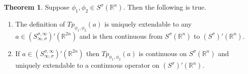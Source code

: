 \documentclass[11pt,a4paper,reqno]{amsart}
\numberwithin{equation}{section}
\theoremstyle{definition}
\newtheorem{thm}{Theorem}[section]
\theoremstyle{definition}
\begin{document}
    \begin{thm}
    Suppose $\phi_1,\phi_2 \in S^\sigma(\mathbb{R}^n)$. Then the following is true.
    \begin{enumerate}[label=(\alph*)]
        \item The definition of $Tp_{\phi_1,\phi_2}(a)$ is uniquely extendable to any $a\in (S_{\infty,\sigma}^{\sigma,\infty})'(\mathbb{R}^{2 n})$ and is then continuous from $S^\sigma(\mathbb{R}^n)$ to $(S^\sigma)'(\mathbb{R}^n)$.
        \item If $a\in (S_{\infty,\sigma}^{\sigma,\infty})'(\mathbb{R}^{2 n})$ then $Tp_{\phi_1,\phi_2}(a)$ is continuous on $S^\sigma(\mathbb{R}^n)$ and uniquely extendable to a continuous operator on $(S^\sigma)'(\mathbb{R}^n)$.
    \end{enumerate}
    \end{thm}
\end{document}
